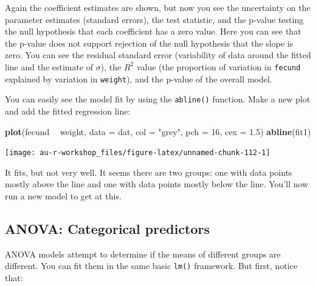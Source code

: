 \documentclass[]{book}
\newenvironment{Shaded}{\begin{snugshade}}{\end{snugshade}}
\newcommand{\KeywordTok}[1]{\textcolor[rgb]{0.13,0.29,0.53}{\textbf{#1}}}
\newcommand{\DataTypeTok}[1]{\textcolor[rgb]{0.13,0.29,0.53}{#1}}
\newcommand{\DecValTok}[1]{\textcolor[rgb]{0.00,0.00,0.81}{#1}}
\newcommand{\FloatTok}[1]{\textcolor[rgb]{0.00,0.00,0.81}{#1}}
\newcommand{\StringTok}[1]{\textcolor[rgb]{0.31,0.60,0.02}{#1}}
\newcommand{\OperatorTok}[1]{\textcolor[rgb]{0.81,0.36,0.00}{\textbf{#1}}}
\newcommand{\NormalTok}[1]{#1}
\theoremstyle{definition}
\theoremstyle{definition}
\theoremstyle{definition}
\theoremstyle{remark}
\begin{document}
Again the coefficient estimates are shown, but now you see the
uncertainty on the parameter estimates (standard errors), the test
statistic, and the p-value testing the null hypothesis that each
coefficient has a zero value. Here you can see that the p-value does not
support rejection of the null hypothesis that the slope is zero. You can
see the residual standard error (variability of data around the fitted
line and the estimate of \(\sigma\)), the \(R^2\) value (the proportion
of variation in \texttt{fecund} explained by variation in
\texttt{weight}), and the p-value of the overall model.

You can easily see the model fit by using the \texttt{abline()}
function. Make a new plot and add the fitted regression line:

\begin{Shaded}
\begin{Highlighting}[]
\KeywordTok{plot}\NormalTok{(fecund }\OperatorTok{~}\StringTok{ }\NormalTok{weight, }\DataTypeTok{data =}\NormalTok{ dat, }\DataTypeTok{col =} \StringTok{"grey"}\NormalTok{, }\DataTypeTok{pch =} \DecValTok{16}\NormalTok{, }\DataTypeTok{cex =} \FloatTok{1.5}\NormalTok{)}
\KeywordTok{abline}\NormalTok{(fit1)}
\end{Highlighting}
\end{Shaded}

\begin{center}\texttt{[image: au-r-workshop\_files/figure-latex/unnamed-chunk-112-1]} \end{center}

It fits, but not very well. It seems there are two groups: one with data
points mostly above the line and one with data points mostly below the
line. You'll now run a new model to get at this.

\subsection{ANOVA: Categorical predictors}\label{anova}

ANOVA models attempt to determine if the means of different groups are
different. You can fit them in the same basic \texttt{lm()} framework.
But first, notice that:

\begin{Shaded}
\end{Shaded}
\end{document}
